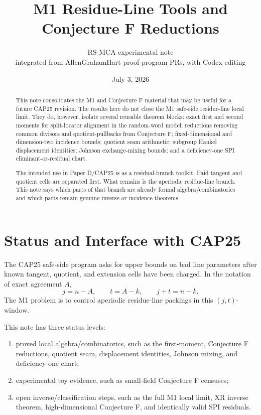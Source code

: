 \documentclass[11pt]{article}
\title{M1 Residue-Line Tools and Conjecture F Reductions}
\author{RS-MCA experimental note\\ \small integrated from AllenGrahamHart proof-program PRs, with Codex editing}
\date{July 3, 2026}
\theoremstyle{definition}
\theoremstyle{remark}
\begin{document}
\maketitle

\begin{abstract}
This note consolidates the M1 and Conjecture F material that may be useful for
a future CAP25 revision.  The results here do not close the M1 safe-side
residue-line local limit.  They do, however, isolate several reusable theorem
blocks: exact first and second moments for split-locator alignment in the
random-word model; reductions removing common divisors and quotient-pullbacks
from Conjecture F; fixed-dimensional and dimension-two incidence bounds;
quotient seam arithmetic; subgroup Hankel displacement identities; Johnson
exchange-mixing bounds; and a deficiency-one SPI eliminant-or-residual chart.

The intended use in Paper D/CAP25 is as a residual-branch toolkit.  Paid
tangent and quotient cells are separated first.  What remains is the aperiodic
residue-line branch.  This note says which parts of that branch are already
formal algebra/combinatorics and which parts remain genuine inverse or
incidence theorems.
\end{abstract}

\section{Status and Interface with CAP25}

The CAP25 safe-side program asks for upper bounds on bad line parameters after
known tangent, quotient, and extension cells have been charged.  In the
notation of exact agreement $A$,
\[
        j=n-A,\qquad t=A-k,\qquad j+t=n-k.
\]
The M1 problem is to control aperiodic residue-line packings in this
$(j,t)$-window.

This note has three status levels:
\begin{enumerate}[label=(\roman*)]
        \item proved local algebra/combinatorics, such as the first-moment,
        Conjecture F reductions, quotient seam, displacement identities,
        Johnson mixing, and deficiency-one chart;
        \item experimental toy evidence, such as small-field Conjecture F
        censuses;
        \item open inverse/classification steps, such as the full M1 local
        limit, XR inverse theorem, high-dimensional Conjecture F, and
        identically valid SPI residuals.
\end{enumerate}
\end{document}
